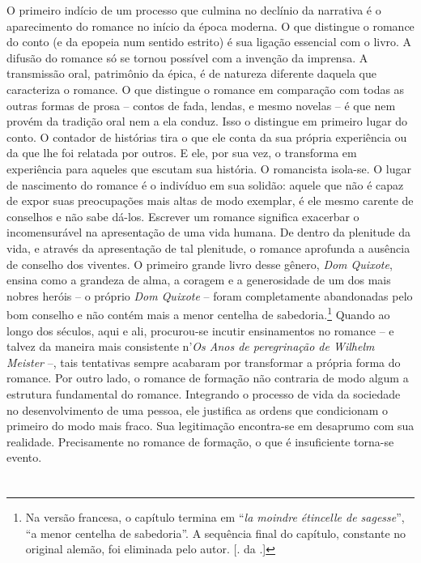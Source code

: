 O primeiro indício de um processo que culmina no declínio da
narrativa é o aparecimento do romance no início da época moderna. O que
distingue o romance do conto (e da epopeia num sentido estrito) é sua
ligação essencial com o livro. A difusão do romance só se tornou
possível com a invenção da imprensa. A transmissão oral, patrimônio da
épica, é de natureza diferente daquela que caracteriza o romance. O que
distingue o romance em comparação com todas as outras formas de prosa --
contos de fada, lendas, e mesmo novelas -- é que nem provém da tradição
oral nem a ela conduz. Isso o distingue em primeiro lugar do conto. O
contador de histórias tira o que ele conta da sua própria experiência ou
da que lhe foi relatada por outros. E ele, por sua vez, o transforma em
experiência para aqueles que escutam sua história. O romancista
isola-se. O lugar de nascimento do romance é o indivíduo em sua solidão:
aquele que não é capaz de expor suas preocupações mais altas de modo
exemplar, é ele mesmo carente de conselhos e não sabe dá-los. Escrever
um romance significa exacerbar o incomensurável na apresentação de uma
vida humana. De dentro da plenitude da vida, e através da apresentação
de tal plenitude, o romance aprofunda a ausência de conselho dos
viventes. O primeiro grande livro desse gênero, \emph{Dom Quixote},
ensina como a grandeza de alma, a coragem e a generosidade de um dos
mais nobres heróis -- o próprio \emph{Dom Quixote} -- foram
completamente abandonadas pelo bom conselho e não contém mais a menor
centelha de sabedoria.\footnote{Na versão francesa, o capítulo termina
  em ``\emph{la moindre étincelle de sagesse}'', ``a menor centelha de
  sabedoria''. A sequência final do capítulo, constante no original
  alemão, foi eliminada pelo autor. [. da .]} Quando ao longo dos
séculos, aqui e ali, procurou-se incutir ensinamentos no romance -- e
talvez da maneira mais consistente n'\emph{Os Anos de peregrinação de
Wilhelm Meister} --, tais tentativas sempre acabaram por transformar a
própria forma do romance. Por outro lado, o romance de formação não
contraria de modo algum a estrutura fundamental do romance. Integrando o
processo de vida da sociedade no desenvolvimento de uma pessoa, ele
justifica as ordens que condicionam o primeiro do modo mais fraco. Sua
legitimação encontra-se em desaprumo com sua realidade. Precisamente no
romance de formação, o que é insuficiente torna-se evento.

\section{}

